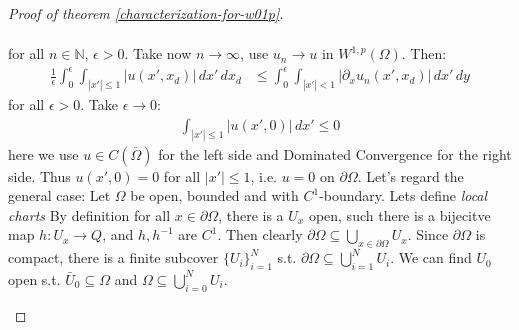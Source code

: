 \documentclass{report}
\theoremstyle{tommy}
\begin{document}
\begin{proof}[Proof of theorem \ref{characterization-for-w01p}]
\begin{itemize}
\begin{align*}
      \end{align*}
      for all \(n \in \mathbb{N}\), \(\epsilon > 0\). Take now \(n \to \infty\), use \(u_n \to u\) in \(W^{1,p}(\Omega)\). Then:
      \begin{align*}
        \frac{1}{\epsilon} \int_0^\epsilon \int_{|x'| \le 1} |u(x', x_d)| \, dx' \, dx_d
        &\le \int_0^\epsilon \int_{|x'| < 1} |\partial_x u_n(x', x_d)| \, dx' \, dy
      \end{align*}
      for all \(\epsilon > 0\). Take \(\epsilon \to 0\):
      \begin{align*}
        \int_{|x'| \le 1} |u(x', 0)| \, dx' \le 0
      \end{align*}
      here we use \(u \in C(\bar \Omega)\) for the left side and Dominated Convergence for the right side. Thus \(u(x', 0) = 0\) for all \(|x'| \le 1\), i.e. \(u = 0\) on \(\partial \Omega\). Let's regard the general case: Let \(\Omega\) be open, bounded and with \(C^1\)-boundary. Lets define \emph{local charts} By definition for all \(x \in \partial \Omega\), there is a \(U_x\) open, such there is a bijecitve map \(h: U_x \to Q\), and \(h, h^{-1}\) are \(C^1\). Then clearly \(\partial \Omega \subseteq \bigcup_{x \in \partial \Omega} U_x\). Since \(\partial \Omega\) is compact, there is a finite subcover \(\{U_i\}_{i=1}^N\) s.t. \(\partial \Omega \subseteq \bigcup_{i=1}^N U_i\). We can find \(U_0\) open s.t. \(\bar U_0 \subseteq \Omega\) and \(\Omega \subseteq \bigcup_{i=0}^N U_i\).


\end{itemize}
\end{proof}
\end{document}
